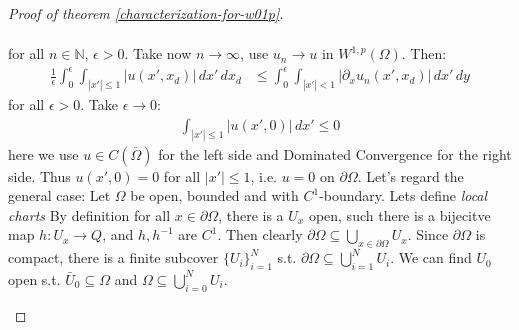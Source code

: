 \documentclass{report}
\theoremstyle{tommy}
\begin{document}
\begin{proof}[Proof of theorem \ref{characterization-for-w01p}]
\begin{itemize}
\begin{align*}
      \end{align*}
      for all \(n \in \mathbb{N}\), \(\epsilon > 0\). Take now \(n \to \infty\), use \(u_n \to u\) in \(W^{1,p}(\Omega)\). Then:
      \begin{align*}
        \frac{1}{\epsilon} \int_0^\epsilon \int_{|x'| \le 1} |u(x', x_d)| \, dx' \, dx_d
        &\le \int_0^\epsilon \int_{|x'| < 1} |\partial_x u_n(x', x_d)| \, dx' \, dy
      \end{align*}
      for all \(\epsilon > 0\). Take \(\epsilon \to 0\):
      \begin{align*}
        \int_{|x'| \le 1} |u(x', 0)| \, dx' \le 0
      \end{align*}
      here we use \(u \in C(\bar \Omega)\) for the left side and Dominated Convergence for the right side. Thus \(u(x', 0) = 0\) for all \(|x'| \le 1\), i.e. \(u = 0\) on \(\partial \Omega\). Let's regard the general case: Let \(\Omega\) be open, bounded and with \(C^1\)-boundary. Lets define \emph{local charts} By definition for all \(x \in \partial \Omega\), there is a \(U_x\) open, such there is a bijecitve map \(h: U_x \to Q\), and \(h, h^{-1}\) are \(C^1\). Then clearly \(\partial \Omega \subseteq \bigcup_{x \in \partial \Omega} U_x\). Since \(\partial \Omega\) is compact, there is a finite subcover \(\{U_i\}_{i=1}^N\) s.t. \(\partial \Omega \subseteq \bigcup_{i=1}^N U_i\). We can find \(U_0\) open s.t. \(\bar U_0 \subseteq \Omega\) and \(\Omega \subseteq \bigcup_{i=0}^N U_i\).


\end{itemize}
\end{proof}
\end{document}
